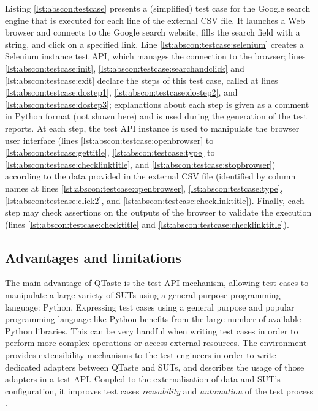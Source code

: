 Listing \ref{lst:abscon:testcase} presents a (simplified) test case for the Google search engine that is executed for each line of the external CSV file. It launches a Web browser and connects to the Google search website, fills the search field with a string, and click on a specified link. 
Line \ref{lst:abscon:testcase:selenium} creates a Selenium instance test API, which manages the connection to the browser; 
lines \ref{lst:abscon:testcase:init}, \ref{lst:abscon:testcase:searchandclick} and \ref{lst:abscon:testcase:exit} declare the steps of this test case, called at lines \ref{lst:abscon:testcase:dostep1}, \ref{lst:abscon:testcase:dostep2}, and \ref{lst:abscon:testcase:dostep3}; 
explanations about each step is given as a comment in Python format (not shown here) and is used during the generation of the test reports.
At each step, the test API instance is used to manipulate the browser user interface (lines \ref{lst:abscon:testcase:openbrowser} to \ref{lst:abscon:testcase:gettitle}, \ref{lst:abscon:testcase:type} to \ref{lst:abscon:testcase:checklinktitle}, and \ref{lst:abscon:testcase:stopbrowser}) according to the data provided in the external CSV file (identified by column names at lines \ref{lst:abscon:testcase:openbrowser}, \ref{lst:abscon:testcase:type}, \ref{lst:abscon:testcase:click2}, and \ref{lst:abscon:testcase:checklinktitle}). 
Finally, each step may check assertions on the outputs of the browser to validate the execution (lines \ref{lst:abscon:testcase:checktitle} and \ref{lst:abscon:testcase:checklinktitle}).


\subsection{Advantages and limitations}

The main advantage of QTaste is the test API mechanism, allowing test cases to manipulate a large variety of SUTs using a general purpose programming language: Python. Expressing test cases using a general purpose and popular programming language like Python benefits from the large number of available Python libraries. This can be very handful when writing test cases in order to perform more complex operations or access external resources. The environment provides extensibility mechanisms to the test engineers in order to write dedicated adapters between QTaste and SUTs, and describes the usage of those adapters in a test API. Coupled to the externalisation of data and SUT's configuration, it improves test cases \emph{reusability} and \emph{automation} of the test process \cite{Utting2007}. 

